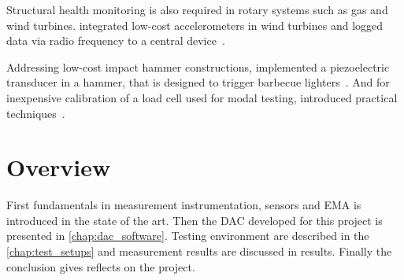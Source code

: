 \newpage
Structural health monitoring is also required in rotary systems such as gas and wind turbines. \citeauthor{esu2014integration} integrated low-cost accelerometers in wind turbines and logged data via radio frequency to a central device~\cite{esu2014integration}.

Addressing low-cost impact hammer constructions, \citeauthor{waltham2009construction} implemented a piezoelectric transducer in a hammer, that is designed to trigger barbecue lighters~\cite{waltham2009construction}. And for inexpensive calibration of a load cell used for modal testing, \citeauthor{wang2015practical} introduced practical techniques~\cite{wang2015practical}.

\section{Overview}

First fundamentals in measurement instrumentation, sensors and \ac{EMA} is introduced in the state of the art. Then the \acf{DAC} developed for this project is presented in \autoref{chap:dac_software}. Testing environment are described in the \autoref{chap:test_setups} and measurement results are discussed in results. Finally the conclusion gives reflects on the project.
